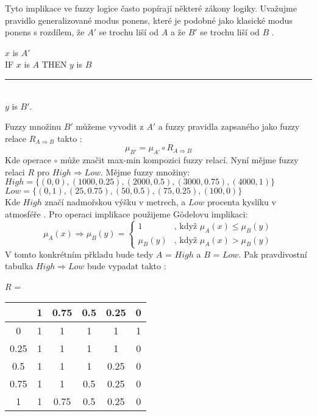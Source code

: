 \documentclass[
  program=inf,
  figures,
  tables,
  glossaries,
  index
]{kidiplom}
\begin{document}
Tyto implikace ve fuzzy logice často popírají některé zákony logiky. Uvažujme pravidlo generalizované modus ponens, které je podobné jako klasické modus ponens s rozdílem, že $A'$ se trochu liší od $A$ a že $B'$ se trochu liší od $B$ \cite{bFoFC}.
\begin{center}
$x$ is $A'$\\
IF $x$ is $A$ THEN $y$ is $B$ \\
\vspace{-6pt}
\rule{140pt}{1pt} \\
$y$ is $B'$.
\end{center}
Fuzzy množinu $B'$ můžeme vyvodit z $A'$ a fuzzy pravidla zapsaného jako fuzzy relace $R_{A\Rightarrow B}$ takto \cite{bFoFC}:
\[\mu_{B'} = \mu_{A'}\circ R_{A\Rightarrow B} \]
Kde operace $\circ$ může značit max-min kompozici fuzzy relací. Nyní mějme fuzzy relaci $R$ pro $High \Rightarrow Low$. Mějme fuzzy množiny: \\ $High = \{(0, 0) , (1000, 0.25) , (2000, 0.5) , (3000, 0.75) , (4000, 1) \}$\\  $Low = \{(0, 1) , (25, 0.75) , (50, 0.5) , (75, 0.25) , (100, 0) \}$\\
Kde $High$ značí nadmořskou výšku v metrech, a $Low$ procenta kyslíku v atmosféře \cite{bFoFC}. Pro operaci implikace použijeme Gödelovu implikaci:
\[ \mu_{A}(x) \Rightarrow \mu_{B}(y) = \left\{
	\begin{array}{ll}
		1  & \mbox{, když } \mu_{A}(x) \leq \mu_{B}(y) \\
		\mu_{B}(y) & \mbox{, když } \mu_{A}(x) > \mu_{B}(y)
	\end{array}
\right. \] 
V tomto konkrétním přkladu bude tedy $A$ = $High$ a $B$ = $Low$.
Pak pravdivostní tabulka $High \Rightarrow Low$ bude vypadat takto \cite{bFoFC}:
\begin{table}
\centering
$R$ = 
\begin{tabular}{ c | c | c | c | c | c | } 
  & 1 & 0.75 & 0.5 & 0.25 & 0 \\ 
  \hline
  0 & 1 & 1 & 1 & 1 & 1 \\ 
  \hline
  0.25 & 1 & 1 & 1 & 1 & 0 \\ 
  \hline
  0.5 & 1 & 1 & 1 & 0.25 & 0 \\ 
  \hline
  0.75 & 1 & 1 & 0.5 & 0.25 & 0 \\ 
  \hline
  1 & 1 & 0.75 & 0.5 & 0.25 & 0 \\ 
  \hline
\end{tabular}
\end{table}
\end{document}
